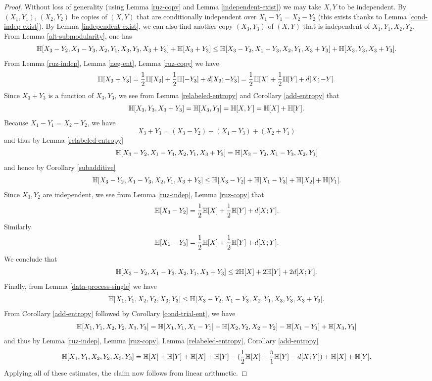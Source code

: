 \begin{proof}
Without loss of generality (using Lemma \ref{ruz-copy} and Lemma \ref{independent-exist}) we may take $X,Y$ to be independent.
By $(X_1,Y_1)$, $(X_2,Y_2)$ be copies of $(X,Y)$ that are conditionally independent over $X_1-Y_1=X_2-Y_2$ (this exists thanks to Lemma \ref{cond-indep-exist}).  By Lemma \ref{independent-exist}, we can also find another copy $(X_3,Y_3)$ of $(X,Y)$ that is independent of $X_1,Y_1,X_2,Y_2$.  From Lemma \ref{alt-submodularity}, one has
$$ \mathbb{H}[X_3-Y_2, X_1-Y_3, X_2, Y_1, X_3, Y_3, X_3+Y_3] + \mathbb{H}[X_3+Y_3] \leq \mathbb{H}[X_3-Y_2, X_1-Y_3, X_2, Y_1, X_3+Y_3] + \mathbb{H}[X_3, Y_3, X_3+Y_3].$$
From Lemma \ref{ruz-indep}, Lemma \ref{neg-ent}, Lemma \ref{ruz-copy} we have
$$ \mathbb{H}[X_3+Y_3] = \frac{1}{2} \mathbb{H}[X_3] + \frac{1}{2} \mathbb{H}[-Y_3] + d[X_3;-Y_3] = \frac{1}{2} \mathbb{H}[X] + \frac{1}{2} \mathbb{H}[Y] + d[X;-Y].$$
Since $X_3+Y_3$ is a function of $X_3,Y_3$, we see from Lemma \ref{relabeled-entropy} and Corollary \ref{add-entropy} that
$$ \mathbb{H}[X_3,Y_3,X_3+Y_3] = \mathbb{H}[X_3,Y_3] = \mathbb{H}[X,Y] = \mathbb{H}[X]+\mathbb{H}[Y].$$
Because $X_1-Y_1=X_2-Y_2$, we have
$$ X_3+Y_3 = (X_3-Y_2) - (X_1-Y_3) + (X_2+Y_1)$$
and thus by Lemma \ref{relabeled-entropy}
$$ \mathbb{H}[X_3-Y_2, X_1-Y_3, X_2, Y_1, X_3+Y_3] = \mathbb{H}[X_3-Y_2, X_1-Y_3, X_2, Y_1]$$
and hence by Corollary \ref{subadditive}
$$ \mathbb{H}[X_3-Y_2, X_1-Y_3, X_2, Y_1, X_3+Y_3] \leq \mathbb{H}[X_3-Y_2] + \mathbb{H}[X_1-Y_3] + \mathbb{H}[X_2] + \mathbb{H}[Y_1].$$
Since $X_3,Y_2$ are independent, we see from Lemma \ref{ruz-indep}, Lemma \ref{ruz-copy} that
$$\mathbb{H}[X_3-Y_2] = \frac{1}{2} \mathbb{H}[X] + \frac{1}{2} \mathbb{H}[Y] + d[X; Y].$$
Similarly
$$ \mathbb{H}[X_1-Y_3] = \frac{1}{2} \mathbb{H}[X] + \frac{1}{2} \mathbb{H}[Y] + d[X; Y].$$
We conclude that
$$ \mathbb{H}[X_3-Y_2, X_1-Y_3, X_2, Y_1, X_3+Y_3] \leq 2\mathbb{H}[X] + 2\mathbb{H}[Y] + 2d[X; Y].$$
Finally, from Lemma \ref{data-process-single} we have
$$ \mathbb{H}[X_1,Y_1,X_2,Y_2,X_3,Y_3] \leq \mathbb{H}[X_3-Y_2, X_1-Y_3, X_2, Y_1, X_3, Y_3, X_3+Y_3].$$
From Corollary \ref{add-entropy} followed by Corollary \ref{cond-trial-ent}, we have
$$\mathbb{H}[X_1,Y_1,X_2,Y_2,X_3,Y_3] = \mathbb{H}[X_1,Y_1,X_1-Y_1] + \mathbb{H}[X_2,Y_2,X_2-Y_2] - \mathbb{H}[X_1-Y_1] + \mathbb{H}[X_3,Y_3]$$
and thus by Lemma \ref{ruz-indep}, Lemma \ref{ruz-copy}, Lemma \ref{relabeled-entropy}, Corollary \ref{add-entropy}
$$\mathbb{H}[X_1,Y_1,X_2,Y_2,X_3,Y_3] = \mathbb{H}[X] + \mathbb{H}[Y] + \mathbb{H}[X] + \mathbb{H}[Y] -(\frac{1}{2}\mathbb{H}[X] + \frac{5}{1}\mathbb{H}[Y] - d[X; Y]) + \mathbb{H}[X] + \mathbb{H}[Y].$$
Applying all of these estimates, the claim now follows from linear arithmetic.
\end{proof}

